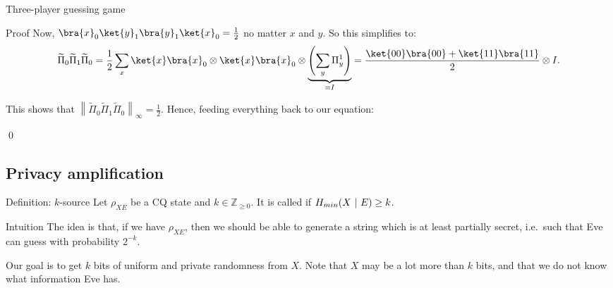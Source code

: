 \documentclass[a4paper]{article}
\begin{document}
\begin{parag}{Three-player guessing game}
\begin{subparag}{Proof}
        Now, $\bra{x}_0 \ket{y}_1 \bra{y}_1 \ket{x}_0 = \frac{1}{2}$ no matter $x$ and $y$. So this simplifies to:
        \[\widetilde{\Pi}_0 \widetilde{\Pi}_1 \widetilde{\Pi}_0 = \frac{1}{2} \sum_{x} \ket{x}\bra{x}_0 \otimes \ket{x}\bra{x}_0 \otimes \underbrace{\left(\sum_{y} \Pi_y^1\right)}_{= I} = \frac{\ket{00}\bra{00} + \ket{11}\bra{11}}{2} \otimes I.\]

        This shows that $\left\|\widetilde{\Pi}_0 \widetilde{\Pi}_1 \widetilde{\Pi}_0\right\|_{\infty} = \frac{1}{2}$. Hence, feeding everything back to our equation: 
        
        \qed
    \end{subparag}
\end{parag}

%

\subsection{Privacy amplification}

\begin{parag}{Definition: $k$-source}
    Let $\rho_{XE}$ be a CQ state and $k \in \mathbb{Z}_{\geq 0}$. It is called  if $H_{min}\left(X \suchthat E\right) \geq k$.

    \begin{subparag}{Intuition}
        The idea is that, if we have $\rho_{XE}$, then we should be able to generate a string which is at least partially secret, i.e.~such that Eve can guess with probability $2^{-k}$.

        Our goal is to get $k$ bits of uniform and private randomness from $X$. Note that $X$ may be a lot more than $k$ bits, and that we do not know what information Eve has.
    \end{subparag}
\end{parag}
\end{document}

